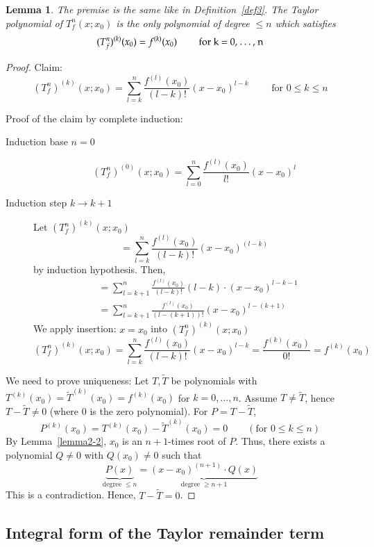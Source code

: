 \documentclass{article}
\newtheorem{lemma}{Lemma}  \numberwithin{lemma}{section}
\begin{document}
\begin{lemma} %
  The premise is the same like in Definition~\ref{def3}.
  The Taylor polynomial of $T_f^n(x; x_0)$ is the only polynomial of degree $\leq n$ which satisfies
  \[ (T_f^n)^{(k)}(x_0) = f^{(k)}(x_0) \qquad \text{ for k = 0, \dots, n} \]
\end{lemma}

\begin{proof}
  Claim:
  \[ (T_f^n)^{(k)}(x; x_0) = \sum_{l=k}^n \frac{f^{(l)}(x_0)}{(l - k)!} (x - x_0)^{l-k} \qquad \text{ for } 0 \leq k \leq n \]

  Proof of the claim by complete induction:
  \begin{description}
    \item[Induction base $n = 0$] 
      \[ (T_f^n)^{(0)} (x; x_0) = \sum_{l=0}^n \frac{f^{(l)}(x_0)}{l!} (x - x_0)^l \]
    \item[Induction step $k \to k + 1$]
      Let $(T_f^n)^{(k)}(x; x_0)$
      \[ = \sum_{l=k}^{n} \frac{f^{(l)}(x_0)}{(l - k)!} (x - x_0)^{(l-k)} \]
      by induction hypothesis. Then,
      \begin{align*}
        &= \sum_{l=k+1}^n \frac{f^{(l)}(x_0)}{(l-k)!} (l - k) \cdot (x - x_0)^{l - k - 1} \\
        &= \sum_{l=k+1}^n \frac{f^{(l)}(x_0)}{(l - (k+1))!} (x - x_0)^{l - (k+1)}
      \end{align*}
      We apply insertion: $x = x_0$ into $(T_f^n)^{(k)}(x; x_0)$
      \[ (T_f^n)^{(k)}(x; x_0) = \sum_{l=k}^n \frac{f^{(l)}(x_0)}{(l - k)!} (x - x_0)^{l-k} = \frac{f^{(k)}(x_0)}{0!} = f^{(k)}(x_0) \]
  \end{description}

  We need to prove uniqueness: Let $T, \tilde T$ be polynomials with $T^{(k)}(x_0) = \tilde T^{(k)}(x_0) = f^{(k)}(x_0)$ for $k = 0, \dots, n$.
  Assume $T \neq \tilde T$, hence $T - \tilde T \neq 0$ (where $0$ is the zero polynomial).
  For $P = T - \tilde T$,
  \[ P^{(k)}(x_0) = T^{(k)}(x_0) - \tilde T^{(k)}(x_0) = 0 \qquad (\text{for } 0 \leq k \leq n) \]
  By Lemma~\ref{lemma2-2}, $x_0$ is an $n+1$-times root of $P$. Thus, there exists a polynomial $Q \neq 0$ with $Q(x_0) \neq 0$ such that
  \[ \underbrace{P(x)}_{\text{degree } \leq n} = \underbrace{(x - x_0)^{(n+1)} \cdot Q(x)}_{\text{degree } \geq n+1} \]
  This is a contradiction. Hence, $T - \tilde T = 0$.
\end{proof}

\subsection{Integral form of the Taylor remainder term}
\end{document}
